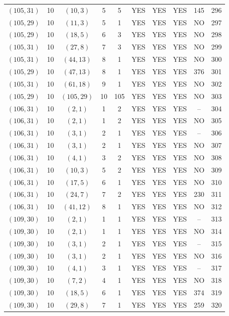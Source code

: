 \begin{longtable}{|c|c|c|c|c|c|c|c|c|c|}
$(105, 31)$ & 10 & $(10, 3)$ & 5 & 5 & YES & YES & YES & 145 & 296\\
$(105, 29)$ & 10 & $(11, 3)$ & 5 & 1 & YES & YES & YES & NO & 297\\
$(105, 29)$ & 10 & $(18, 5)$ & 6 & 3 & YES & YES & YES & NO & 298\\
$(105, 31)$ & 10 & $(27, 8)$ & 7 & 3 & YES & YES & YES & NO & 299\\
$(105, 31)$ & 10 & $(44, 13)$ & 8 & 1 & YES & YES & YES & NO & 300\\
$(105, 29)$ & 10 & $(47, 13)$ & 8 & 1 & YES & YES & YES & 376 & 301\\
$(105, 31)$ & 10 & $(61, 18)$ & 9 & 1 & YES & YES & YES & NO & 302\\
$(105, 29)$ & 10 & $(105, 29)$ & 10 & 105 & YES & YES & YES & NO & 303\\
$(106, 31)$ & 10 & $(2, 1)$ & 1 & 2 & YES & YES & YES & -- & 304\\
$(106, 31)$ & 10 & $(2, 1)$ & 1 & 2 & YES & YES & YES & NO & 305\\
$(106, 31)$ & 10 & $(3, 1)$ & 2 & 1 & YES & YES & YES & -- & 306\\
$(106, 31)$ & 10 & $(3, 1)$ & 2 & 1 & YES & YES & YES & NO & 307\\
$(106, 31)$ & 10 & $(4, 1)$ & 3 & 2 & YES & YES & YES & NO & 308\\
$(106, 31)$ & 10 & $(10, 3)$ & 5 & 2 & YES & YES & YES & NO & 309\\
$(106, 31)$ & 10 & $(17, 5)$ & 6 & 1 & YES & YES & YES & NO & 310\\
$(106, 31)$ & 10 & $(24, 7)$ & 7 & 2 & YES & YES & YES & 230 & 311\\
$(106, 31)$ & 10 & $(41, 12)$ & 8 & 1 & YES & YES & YES & NO & 312\\
$(109, 30)$ & 10 & $(2, 1)$ & 1 & 1 & YES & YES & YES & -- & 313\\
$(109, 30)$ & 10 & $(2, 1)$ & 1 & 1 & YES & YES & YES & NO & 314\\
$(109, 30)$ & 10 & $(3, 1)$ & 2 & 1 & YES & YES & YES & -- & 315\\
$(109, 30)$ & 10 & $(3, 1)$ & 2 & 1 & YES & YES & YES & NO & 316\\
$(109, 30)$ & 10 & $(4, 1)$ & 3 & 1 & YES & YES & YES & -- & 317\\
$(109, 30)$ & 10 & $(7, 2)$ & 4 & 1 & YES & YES & YES & NO & 318\\
$(109, 30)$ & 10 & $(18, 5)$ & 6 & 1 & YES & YES & YES & 374 & 319\\
$(109, 30)$ & 10 & $(29, 8)$ & 7 & 1 & YES & YES & YES & 259 & 320\\

\end{longtable}
